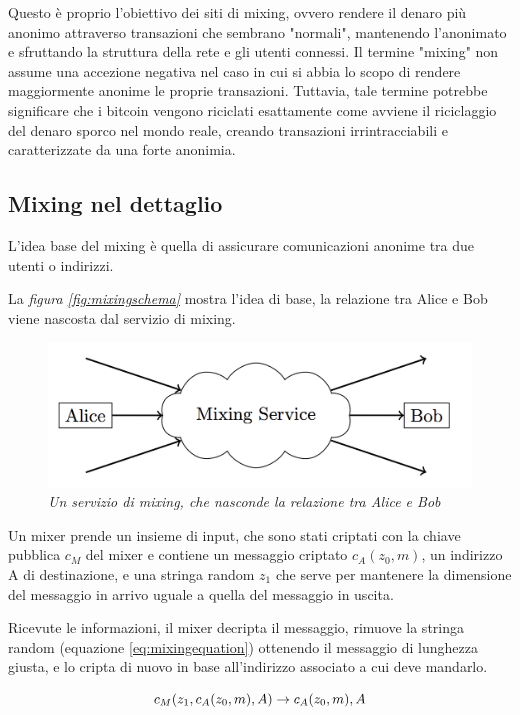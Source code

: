 Questo è proprio l'obiettivo dei siti di mixing, ovvero rendere il denaro più anonimo attraverso transazioni che sembrano "normali", mantenendo l'anonimato e sfruttando la struttura della rete e gli utenti connessi. Il termine "mixing" non assume una accezione negativa nel caso in cui si abbia lo scopo di rendere maggiormente anonime le proprie transazioni. Tuttavia, tale termine potrebbe significare che i bitcoin vengono riciclati esattamente come avviene il riciclaggio del denaro sporco nel mondo reale, creando transazioni irrintracciabili e caratterizzate da una forte anonimia.
\subsection{Mixing nel dettaglio}
L'idea base del mixing è quella di assicurare comunicazioni anonime tra due utenti o indirizzi.

 La \textit{figura \ref{fig:mixingschema}} mostra l'idea di base, la relazione tra Alice e Bob viene nascosta dal servizio di mixing.
\begin{figure}[htbp]
	\centering
	\includegraphics[width = 0.7 \linewidth]{figure/moesermixservice}
	\caption{\textit{Un servizio di mixing, che nasconde la relazione tra Alice e Bob}}\label{moesermixservice}
\end{figure}

Un mixer prende un insieme di input, che sono stati criptati con la chiave pubblica $c_M$ del mixer e contiene un messaggio criptato $c_A(z_0,m)$, un indirizzo A di destinazione, e una stringa random $z_1$ che serve per mantenere la dimensione del messaggio in arrivo uguale a quella del messaggio in uscita.

Ricevute le informazioni, il mixer decripta il messaggio, rimuove la stringa random (equazione \eqref{eq:mixingequation}) ottenendo il messaggio di lunghezza giusta, e lo cripta di nuovo in base all'indirizzo associato a cui deve mandarlo.

\begin{equation}
	\centering
	c_M(z_1,c_A(z_0,m),A) \to c_A(z_0,m),A
	\label{eq:mixingequation}
\end{equation}

